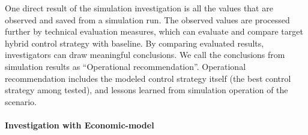 \documentclass[conference]{IEEEtran}
\begin{document}
One direct result of the simulation investigation is all the values
that are observed and saved from a simulation run. The observed values
are processed further by technical evaluation measures, which can
evaluate and compare target hybrid control strategy with baseline. By
comparing evaluated results, investigators can draw meaningful
conclusions. We call the conclusions from
simulation results as ``Operational recommendation''.  
Operational recommendation includes the modeled control strategy
itself (the best control strategy among tested), and lessons learned
from simulation operation of the scenario.  

\paragraph{Investigation with Economic-model}
\end{document}
